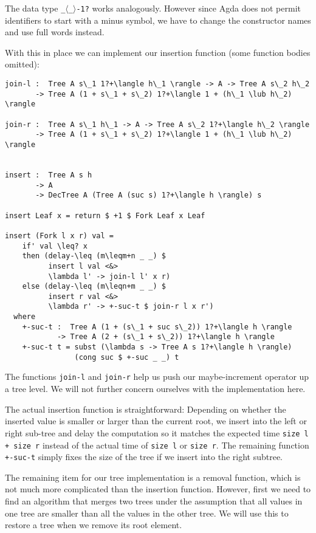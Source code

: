 The data type \texttt{\_$\langle$\_$\rangle$-1?} works analogously. However since Agda does not permit identifiers to start with a minus symbol, we have to change the constructor names and use full words instead.

With this in place we can implement our insertion function (some function bodies omitted):

\begin{lstlisting}[caption={Tree insertion},label={lst:tree:insert},emph={Tree,Fork,Leaf,insert,join,return,if,then,else}]
join-l :  Tree A s\_1 1?+\langle h\_1 \rangle -> A -> Tree A s\_2 h\_2
       -> Tree A (1 + s\_1 + s\_2) 1?+\langle 1 + (h\_1 \lub h\_2) \rangle

join-r :  Tree A s\_1 h\_1 -> A -> Tree A s\_2 1?+\langle h\_2 \rangle
       -> Tree A (1 + s\_1 + s\_2) 1?+\langle 1 + (h\_1 \lub h\_2) \rangle


insert :  Tree A s h
       -> A
       -> DecTree A (Tree A (suc s) 1?+\langle h \rangle) s

insert Leaf x = return $ +1 $ Fork Leaf x Leaf

insert (Fork l x r) val =
    if' val \leq? x
    then (delay-\leq (m\leqm+n _ _) $
          insert l val <&>
          \lambda l' -> join-l l' x r)
    else (delay-\leq (m\leqn+m _ _) $
          insert r val <&>
          \lambda r' -> +-suc-t $ join-r l x r')
  where
    +-suc-t :  Tree A (1 + (s\_1 + suc s\_2)) 1?+\langle h \rangle
            -> Tree A (2 + (s\_1 + s\_2)) 1?+\langle h \rangle
    +-suc-t t = subst (\lambda s -> Tree A s 1?+\langle h \rangle)
                (cong suc $ +-suc _ _) t
\end{lstlisting}

The functions \texttt{join-l} and \texttt{join-r} help us push our maybe-increment operator up a tree level. We will not further concern ourselves with the implementation here.

The actual insertion function is straightforward: Depending on whether the inserted value is smaller or larger than the current root, we insert into the left or right sub-tree and delay the computation so it matches the expected time \texttt{size l + size r} instead of the actual time of \texttt{size l} or \texttt{size r}. The remaining function \texttt{+-suc-t} simply fixes the size of the tree if we insert into the right subtree.

The remaining item for our tree implementation is a removal function, which is not much more complicated than the insertion function. However, first we need to find an algorithm that merges two trees under the assumption that all values in one tree are smaller than all the values in the other tree. We will use this to restore a tree when we remove its root element.

